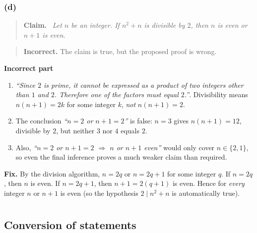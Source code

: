 \documentclass[11pt,a4paper]{article}
\newenvironment{claimbox}[1][]{\par\smallskip\begin{quote}\textbf{#1.}\ \itshape}{\end{quote}}
\newenvironment{verdictbox}[2][]{\par\begin{quote}}{\end{quote}}
\theoremstyle{definition}
\newcommand{\badmark}{\textbf{Incorrect.}}
\begin{document}
\subsubsection*{(d)}
\begin{claimbox}[Claim]
Let $n$ be an integer. If $n^2+n$ is divisible by $2$, then $n$ is even or $n+1$ is even.
\end{claimbox}

\begin{verdictbox}{badred}
\badmark{} The claim is true, but the proposed proof is wrong.
\end{verdictbox}

\textbf{Incorrect part}
\begin{enumerate}
  \item \emph{``Since $2$ is prime, it cannot be expressed as a product of two integers 
  other than $1$ and $2$. Therefore one of the factors must equal $2$.''}. Divisibility means
        $n(n+1)=2k$ for some integer $k$, \emph{not} $n(n+1)=2$.
  \item The conclusion \emph{``$n=2$ or $n+1=2$''} is false: $n=3$ gives $n(n+1)=12$, divisible by $2$, but neither $3$ nor $4$ equals $2$.
  \item Also, \emph{``$n=2$ or $n+1=2$ $\Rightarrow$ $n$ or $n+1$ even''} would only cover $n\in\{2,1\}$, so even the final inference proves a much weaker claim than required.
\end{enumerate}

\textbf{Fix.} By the division algorithm, $n=2q$ or $n=2q+1$ for some integer $q$.
If $n=2q$, then $n$ is even. If $n=2q+1$, then $n+1=2(q+1)$ is even. Hence for \emph{every} integer $n$ or $n+1$ is even
(so the hypothesis $2\mid n^2+n$ is automatically true). 








\section{}

\subsection{Conversion of statements}
\end{document}
